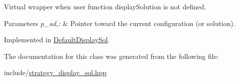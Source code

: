 \-Virtual wrapper when user function display\-Solution is not defined. 


\begin{DoxyParams}{\-Parameters}
{\em p\-\_\-ad,\-:} & \-Pointer toward the current configuration (or solution). \\
\hline
\end{DoxyParams}


\-Implemented in \hyperlink{classDefaultDisplaySol_ab80dde5db4b38e88dba892c5cf94c777}{\-Default\-Display\-Sol}.



\-The documentation for this class was generated from the following file\-:\begin{DoxyCompactItemize}
\item 
include/\hyperlink{strategy__display__sol_8hpp}{strategy\-\_\-display\-\_\-sol.\-hpp}\end{DoxyCompactItemize}
